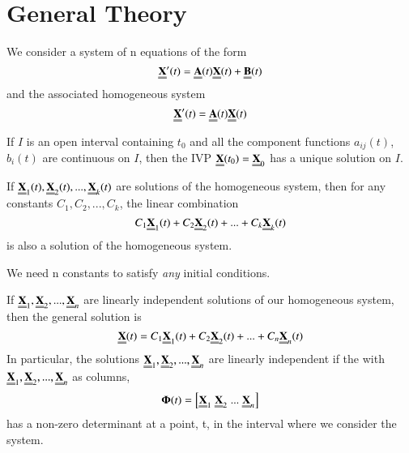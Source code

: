 
\section{General Theory}


We consider a system of n equations of the form \begin{equation}
        \Emph{X}'(t) = \Emph{A}(t)\Emph{X}(t)+\Emph{B}(t) 
\end{equation}
and the associated homogeneous system \begin{equation}
        \Emph{X}'(t) = \Emph{A}(t)\Emph{X}(t) 
\end{equation}



\begin{theorem}
        If $I$ is an open interval containing $t_0$ and all the component functions $a_{ij}(t)$, $b_i(t)$ are continuous on $I$, then the IVP $\Emph{X}(t_0) = \Emph{X}_0$ has a unique solution on $I$.
\end{theorem}




\begin{theorem}
        If $\Emph{X}_1(t), \Emph{X}_2(t),...,\Emph{X}_k(t)$ are solutions of the homogeneous system, then for any constants $C_1,C_2,...,C_k$, the linear combination \begin{equation}
                C_1\Emph{X}_1(t)+ C_2\Emph{X}_2(t)+...+C_k\Emph{X}_k(t)
        \end{equation}
        is also a solution of the homogeneous system.
\end{theorem}

\begin{note}[In General]
        We need n constants to satisfy \emph{any} initial conditions.
\end{note}


\begin{theorem}
        If $\Emph{X}_1,\Emph{X}_2,...,\Emph{X}_n$ are linearly independent solutions of our homogeneous system, then the general solution is \begin{equation}
                \Emph{X}(t) = C_1\Emph{X}_1(t)+C_2\Emph{X}_2(t)+...+C_n\Emph{X}_n(t)
        \end{equation}
        In particular, the solutions $\Emph{X}_1,\Emph{X}_2,...,\Emph{X}_n$ are linearly independent if the  with $\Emph{X}_1,\Emph{X}_2,...,\Emph{X}_n$ as columns, \begin{equation}
                \boldsymbol{\Phi}(t) = \left[\Emph{X}_1\;\Emph{X}_2\;...\;\Emph{X}_n\right]
        \end{equation}
        has a non-zero determinant at a point, t, in the interval where we consider the system.
\end{theorem}


